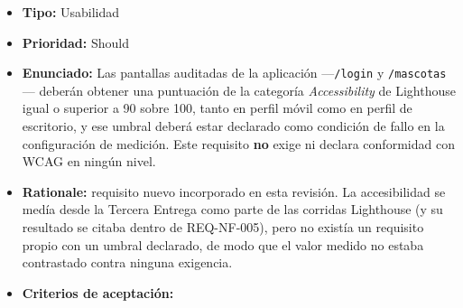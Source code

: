 \documentclass[
  spanish,
]{article}
\providecommand{\tightlist}{%
  \setlength{\itemsep}{0pt}\setlength{\parskip}{0pt}}
\begin{document}
\begin{itemize}
\tightlist
\item
  \textbf{Tipo:} Usabilidad
\item
  \textbf{Prioridad:} Should
\item
  \textbf{Enunciado:} Las pantallas auditadas de la aplicación
  ---\texttt{/\allowbreak{}login} y \texttt{/\allowbreak{}mascotas}--- deberán obtener una
  puntuación de la categoría \emph{Accessibility} de Lighthouse igual o
  superior a 90 sobre 100, tanto en perfil móvil como en perfil de
  escritorio, y ese umbral deberá estar declarado como condición de
  fallo en la configuración de medición. Este requisito \textbf{no}
  exige ni declara conformidad con WCAG en ningún nivel.
\item
  \textbf{Rationale:} requisito nuevo incorporado en esta revisión. La
  accesibilidad se medía desde la Tercera Entrega como parte de las
  corridas Lighthouse (y su resultado se citaba dentro de REQ-NF-005),
  pero no existía un requisito propio con un umbral declarado, de modo
  que el valor medido no estaba contrastado contra ninguna exigencia.
\item
  \textbf{Criterios de aceptación:}


\end{itemize}
\end{document}
